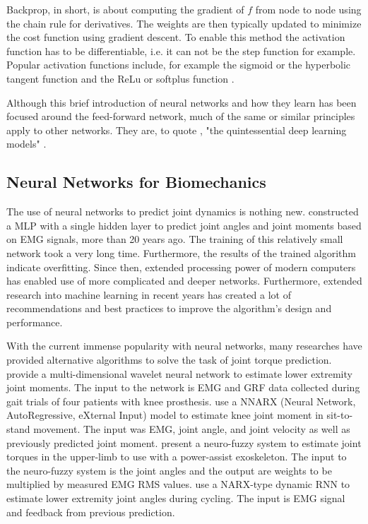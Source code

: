 \documentclass[../main.tex]{subfiles}
\begin{document}
Backprop, in short, is about computing the gradient of $f$ from node to node using the chain rule for derivatives. 
The weights are then typically updated to minimize the cost function using gradient descent.
To enable this method the activation function has to be differentiable, i.e. it can not be the step function for example.
Popular activation functions include, for example the sigmoid or the hyperbolic tangent function and the ReLu or softplus function \cite{Goodfellow2016, Haykin2009, Rojas1996}.

Although this brief introduction of neural networks and how they learn has been focused around the feed-forward network, much of the same or similar principles apply to other networks. 
They are, to quote \textcite{Goodfellow2016}, "the quintessential deep learning models" \parencite[164]{Goodfellow2016}.




\subsection{Neural Networks for Biomechanics}
The use of neural networks to predict joint dynamics is nothing new.
\textcite{Sepulveda1993} constructed a \ac{MLP} with a single hidden layer to predict joint angles and joint moments based on EMG signals, more than 20 years ago. 
The training of this relatively small network took a very long time.
Furthermore, the results of the trained algorithm indicate overfitting.
Since then, extended processing power of modern computers has enabled use of more complicated and deeper networks.
Furthermore, extended research into machine learning in recent years has created a lot of recommendations and best practices to improve the algorithm's design and performance.

With the current immense popularity with neural networks, many researches have provided alternative algorithms to solve the task of joint torque prediction.
\textcite{Ardestani2014} provide a multi-dimensional wavelet neural network to estimate lower extremity joint moments. 
The input to the network is \ac{EMG} and \ac{GRF} data collected during gait trials of four patients with knee prosthesis. 
\textcite{Lee14-1} use a NNARX (Neural Network, AutoRegressive, eXternal Input) model to estimate knee joint moment in sit-to-stand movement. 
The input was \ac{EMG}, joint angle, and joint velocity as well as previously predicted joint moment. 
\textcite{Kiguchi2012} present a neuro-fuzzy system to estimate joint torques in the upper-limb to use with a power-assist exoskeleton. 
The input to the neuro-fuzzy system is the joint angles and the output are weights to be multiplied by measured \ac{EMG} RMS values.
\textcite{Cui2016} use a NARX-type dynamic \ac{RNN} to estimate lower extremity joint angles during cycling. 
The input is \ac{EMG} signal and feedback from previous prediction.
\end{document}
